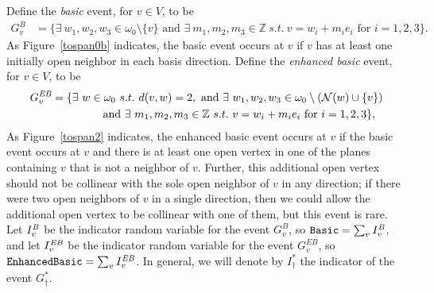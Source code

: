 \documentclass{amsart}
\newcommand{\vect}[1]{{ #1}}
\newcommand{\B}{I^{\text{\em B}}}
\newcommand{\EB}{I^{\text{\em EB}}}
\newcommand{\basic}{\operatorname{\tt Basic}}
\newcommand{\ebasic}{\operatorname{\tt Enhanced Basic}}
\newcommand{\event}{G}
\numberwithin{equation}{section}
\theoremstyle{definition}
\theoremstyle{remark}
\begin{document}
Define the {\em basic} event, for $\vect{v} \in V$, to be
\begin{align*}
\event^B_{\vect{v}} &= \{ \exists \ \vect{w_1}, \vect{w_2}, \vect{w_3} \in \omega_0 \setminus \{\vect{v}\} \text{ and }\exists\ m_1, m_2, m_3 \in \mathbb{Z} \ s.t. \ \vect{v} = \vect{w_i} + m_i \vect{e_i} \text{ for } i=1,2,3 \}.
\end{align*}
As Figure~\ref{tospan0b} indicates, the basic event occurs at $\vect{v}$ if $\vect{v}$ has at least one initially open neighbor in each basis direction.  Define the {\em enhanced basic} event, for $\vect{v} \in V$, to be
\begin{align*}
\event^{\text{\em EB}}_{\vect{v}} &=   \{\exists \ \vect{w} \in \omega_0 \ s.t. \ d(\vect{v}, \vect{w}) = 2, \text{ and }  \exists \ \vect{w_1}, \vect{w_2}, \vect{w_3} \in \omega_0 \setminus (\mathcal{N}(w)\cup\{\vect{v}\}) \\
& \hspace{1.5cm} \text{ and }\exists\ m_1, m_2, m_3 \in \mathbb{Z} \ s.t. \ \vect{v} = \vect{w_i} + m_i \vect{e_i} \text{ for } i=1,2,3\},
\end{align*}
As Figure~\ref{tospan2} indicates, the enhanced basic event occurs at $\vect{v}$ if the basic event occurs at $\vect{v}$ and there is at least one open vertex in one of the planes containing $\vect{v}$ that is not a neighbor of $\vect{v}$.  Further, this additional open vertex should not be collinear with the sole open neighbor of $\vect{v}$ in any direction; if there were two open neighbors of $\vect{v}$ in a single direction, then we could allow the additional open vertex to be collinear with one of them, but this event is rare.  Let $\B_{\vect{v}}$ be the indicator random variable for the event $\event^B_{\vect{v}}$, so $\basic = \sum_\vect{v} \B_{\vect{v}}$,  and let $\EB_{\vect{v}}$ be the indicator random variable for the event $\event^{EB}_\vect{v}$, so $\ebasic = \sum_{\vect{v}} \EB_{\vect{v}}$.   In general, we will denote by $I_\dagger^*$ the indicator of the event $\event_\dagger^*$.
\end{document}
